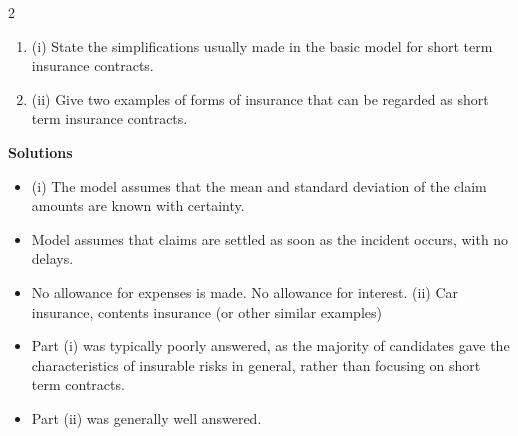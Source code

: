 \documentclass[a4paper,12pt]{article}
\begin{document}

2 
\begin{enumerate}
\item (i) State the simplifications usually made in the basic model for short term
insurance contracts. 
\item (ii) Give two examples of forms of insurance that can be regarded as short term
insurance contracts. 
\end{enumerate}

\noindent \textbf{Solutions}\\

\begin{itemize}
\item (i) The model assumes that the mean and standard deviation of the claim amounts
are known with certainty.
\item Model assumes that claims are settled as soon as the incident occurs, with no
delays.

\item No allowance for expenses is made.
No allowance for interest.
(ii) Car insurance, contents insurance (or other similar examples)
\item Part (i) was typically poorly answered, as the majority of candidates gave the
characteristics of insurable risks in general, rather than focusing on short term
contracts.
\item 
Part (ii) was generally well answered.
\end{itemize}
\end{document}
